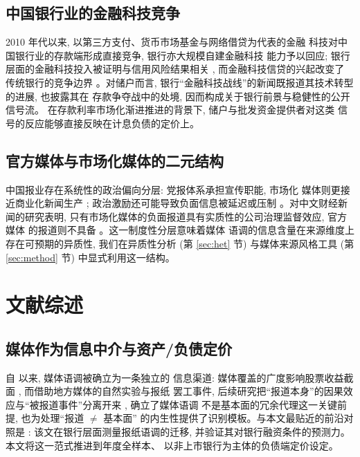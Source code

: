 \subsection{中国银行业的金融科技竞争}
2010 年代以来, 以第三方支付、货币市场基金与网络借贷为代表的金融
科技对中国银行业的存款端形成直接竞争, 银行亦大规模自建金融科技
能力予以回应; 银行层面的金融科技投入被证明与信用风险结果相关
\parencite{cheng2020bankfintech}, 而金融科技信贷的兴起改变了
传统银行的竞争边界 \parencite{berg2022fintechlending}。对储户而言,
银行``金融科技战线''的新闻既报道其技术转型的进展, 也披露其在
存款争夺战中的处境, 因而构成关于银行前景与稳健性的公开信号流。
在存款利率市场化渐进推进的背景下, 储户与批发资金提供者对这类
信号的反应能够直接反映在计息负债的定价上。

\subsection{官方媒体与市场化媒体的二元结构}
中国报业存在系统性的政治偏向分层: 党报体系承担宣传职能, 市场化
媒体则更接近商业化新闻生产 \parencite{qin2018mediabias};
政治激励还可能导致负面信息被延迟或压制
\parencite{piotroski2015political}。对中文财经新闻的研究表明,
只有市场化媒体的负面报道具有实质性的公司治理监督效应, 官方媒体
的报道则不具备 \parencite{you2018pen}。这一制度性分层意味着媒体
语调的信息含量在来源维度上存在可预期的异质性, 我们在异质性分析
(第 \ref{sec:het} 节) 与媒体来源风格工具 (第 \ref{sec:method} 节)
中显式利用这一结构。

\section{文献综述}\label{sec:lit}

\subsection{媒体作为信息中介与资产/负债定价}
自 \textcite{tetlock2007giving} 以来, 媒体语调被确立为一条独立的
信息渠道: 媒体覆盖的广度影响股票收益截面
\parencite{fangperess2009media}, 而借助地方媒体的自然实验与报纸
罢工事件, 后续研究把``报道本身''的因果效应与``被报道事件''分离开来
\parencite{engelberg2011causal, peress2014media}, 确立了媒体语调
不是基本面的冗余代理这一关键前提, 也为处理``报道 $\ne$ 基本面''
的内生性提供了识别模板。与本文最贴近的前沿对照是
\textcite{marchetti2025tone}: 该文在银行层面测量报纸语调的迁移,
并验证其对银行融资条件的预测力。本文将这一范式推进到年度全样本、
以非上市银行为主体的负债端定价设定。

